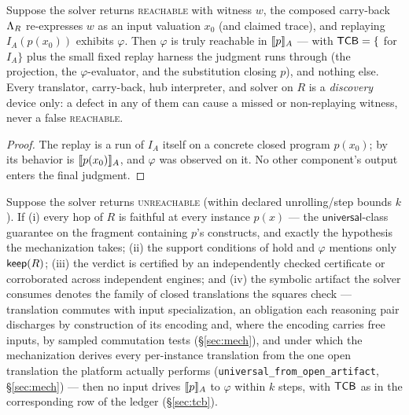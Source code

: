 \begin{theorem}
\label{thm:existential}
Suppose the solver returns \textsc{reachable} with witness $w$, the
composed carry-back $\Lambda_R$ re-expresses $w$ as an input valuation
$x_0$ (and claimed trace), and replaying $I_A(p(x_0))$ exhibits
$\varphi$. Then $\varphi$ is truly reachable in $\llbracket p \rrbracket_{A}$ --- with
$\mathsf{TCB} = \{$ for $I_A\}$ plus the small fixed replay
harness the judgment runs through (the projection, the
$\varphi$-evaluator, and the substitution closing $p$), and nothing
else. Every
translator, carry-back, hub interpreter, and solver on $R$ is a
\emph{discovery} device only: a defect in any of them can cause a missed
or non-replaying witness, never a false \textsc{reachable}.
\end{theorem}

\begin{proof}
The replay is a run of $I_A$ itself on a concrete closed program
$p(x_0)$; by  its behavior is $\llbracket p(x_0) \rrbracket_{A}$, and
$\varphi$ was observed on it. No other component's output enters the
final judgment.
\end{proof}

\begin{theorem}
\label{thm:universal}
Suppose the solver returns \textsc{unreachable} (within declared
unrolling/step bounds $k$). If (i) every hop of $R$ is faithful at every
instance $p(x)$ --- the $\mathsf{universal}$-class guarantee on the
fragment containing $p$'s constructs, and exactly the hypothesis the
mechanization takes; (ii) the support conditions of
 hold and $\varphi$ mentions only $\mathsf{keep}(R)$;
(iii) the verdict is certified by an independently checked certificate
or corroborated across independent engines; and (iv) the symbolic
artifact the solver consumes denotes the family of closed translations
the squares check --- translation commutes with input specialization, an
obligation each reasoning pair discharges by construction of its
encoding and, where the encoding carries free inputs, by sampled
commutation tests (\S\ref{sec:mech}), and under which the mechanization
derives every
per-instance translation from the one open translation the platform
actually performs (\texttt{universal\_from\_open\_artifact},
\S\ref{sec:mech}) --- then no input drives
$\llbracket p \rrbracket_{A}$ to $\varphi$ within $k$ steps, with $\mathsf{TCB}$ as in the
corresponding row of the ledger (\S\ref{sec:tcb}).
\end{theorem}

